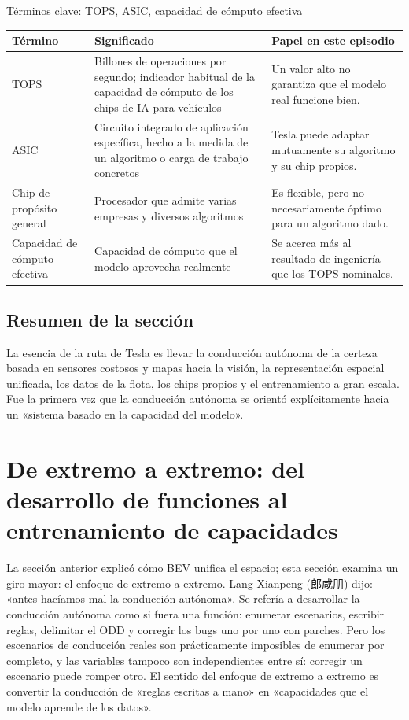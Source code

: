 \documentclass[a4paper]{article}
\begin{document}
\begin{knowledgebox}{Términos clave: TOPS, ASIC, capacidad de cómputo efectiva}
\noindent\begin{tabularx}{\textwidth}{p{}p{}X}
\toprule
Término & Significado & Papel en este episodio \\
\midrule
TOPS & Billones de operaciones por segundo; indicador habitual de la capacidad de cómputo de los chips de IA para vehículos & Un valor alto no garantiza que el modelo real funcione bien. \\
ASIC & Circuito integrado de aplicación específica, hecho a la medida de un algoritmo o carga de trabajo concretos & Tesla puede adaptar mutuamente su algoritmo y su chip propios. \\
Chip de propósito general & Procesador que admite varias empresas y diversos algoritmos & Es flexible, pero no necesariamente óptimo para un algoritmo dado. \\
Capacidad de cómputo efectiva & Capacidad de cómputo que el modelo aprovecha realmente & Se acerca más al resultado de ingeniería que los TOPS nominales. \\
\bottomrule
\end{tabularx}
\end{knowledgebox}

\subsection{Resumen de la sección}

La esencia de la ruta de Tesla es llevar la conducción autónoma de la certeza basada en sensores costosos y mapas hacia la visión, la representación espacial unificada, los datos de la flota, los chips propios y el entrenamiento a gran escala. Fue la primera vez que la conducción autónoma se orientó explícitamente hacia un «sistema basado en la capacidad del modelo».
\section{De extremo a extremo: del desarrollo de funciones al entrenamiento de capacidades}

La sección anterior explicó cómo BEV unifica el espacio; esta sección examina un giro mayor: el enfoque de extremo a extremo. Lang Xianpeng (郎咸朋) dijo: «antes hacíamos mal la conducción autónoma». Se refería a desarrollar la conducción autónoma como si fuera una función: enumerar escenarios, escribir reglas, delimitar el ODD y corregir los bugs uno por uno con parches. Pero los escenarios de conducción reales son prácticamente imposibles de enumerar por completo, y las variables tampoco son independientes entre sí: corregir un escenario puede romper otro. El sentido del enfoque de extremo a extremo es convertir la conducción de «reglas escritas a mano» en «capacidades que el modelo aprende de los datos».
\end{document}

